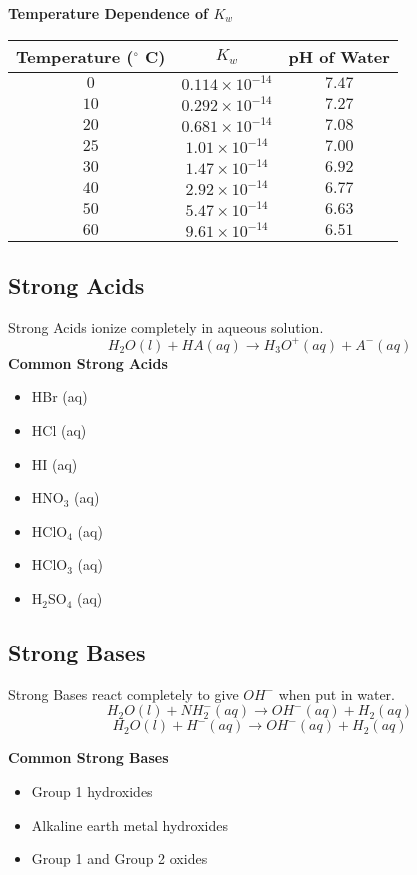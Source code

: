 \documentclass[10pt]{article}
\begin{document}
\begin{center}
\textbf{Temperature Dependence of $K_w$}\\
\begin{tabular}{| c | c | c |}
    \hline
    \textbf{Temperature ($^\circ$ C)} & \textbf{$K_w$} & \textbf{pH of Water} \\
    \hline
    $0$ & $0.114 \times 10^{-14}$ & $7.47$ \\
    $10$ & $0.292 \times 10^{-14}$ & $7.27$ \\
    $20$ & $0.681 \times 10^{-14}$ & $7.08$ \\
    $25$ & $1.01 \times 10^{-14}$ & $7.00$ \\
    $30$ & $1.47 \times 10^{-14}$ & $6.92$ \\
    $40$ & $2.92 \times 10^{-14}$ & $6.77$ \\
    $50$ & $5.47 \times 10^{-14}$ & $6.63$ \\
    $60$ & $9.61 \times 10^{-14}$ & $6.51$ \\
    \hline
\end{tabular}
\end{center}

\subsection*{Strong Acids}
Strong Acids ionize completely in aqueous solution.
\[H_2 O(l) + HA(aq) \rightarrow H_3O^+(aq) + A^-(aq)\]
\textbf{Common Strong Acids}
\begin{itemize}
    \item HBr (aq)
    \item HCl (aq)
    \item HI (aq)
    \item HNO$_3$ (aq)
    \item HClO$_4$ (aq)
    \item HClO$_3$ (aq)
    \item H$_2$SO$_4$ (aq)
\end{itemize}

\subsection*{Strong Bases}
Strong Bases react completely to give $OH^-$ when put in water.
\[H_2O(l) + NH_2^-(aq) \rightarrow OH^-(aq) + H_2(aq)\]
\[H_2O(l) + H^-(aq) \rightarrow OH^-(aq) + H_2(aq)\]

\textbf{Common Strong Bases}
\begin{itemize}
    \item Group 1 hydroxides
    \item Alkaline earth metal hydroxides
    \item Group 1 and Group 2 oxides
\end{itemize}
\end{document}
